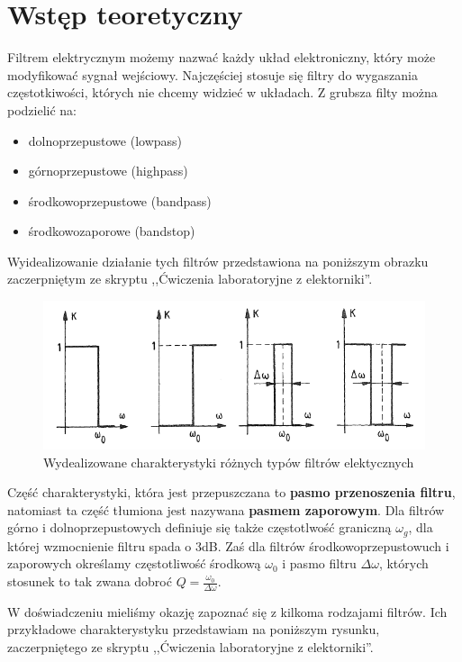\documentclass[a4paper,11pt]{article}
\begin{document}
\section{Wstęp teoretyczny}

Filtrem elektrycznym możemy nazwać każdy układ elektroniczny, który może modyfikować sygnał wejściowy. Najczęściej stosuje się filtry do wygaszania częstotkiwości, których nie chcemy widzieć w układach. Z grubsza filty można podzielić na: 
\begin{itemize}
  \item dolnoprzepustowe (lowpass) 
  \item górnoprzepustowe (highpass)
  \item środkowoprzepustowe (bandpass)
  \item środkowozaporowe (bandstop)
\end{itemize}
Wyidealizowanie działanie tych filtrów przedstawiona na poniższym obrazku zaczerpniętym ze skryptu ,,Ćwiczenia laboratoryjne z elektorniki''.  


\begin{figure} [H]
  \begin{center}
    \includegraphics[width=14cm]{filtry.png}

    \caption{ Wydealizowane charakterystyki różnych typów filtrów elektycznych}
  \end{center}
\end{figure}

Część charakterystyki, która jest przepuszczana to \textbf{pasmo przenoszenia filtru}, natomiast ta część tłumiona jest nazywana \textbf{pasmem zaporowym}. Dla filtrów górno i dolnoprzepustowych definiuje się także częstotlwość graniczną $ \omega_g$, dla której wzmocnienie filtru spada o 3dB. Zaś dla filtrów środkowoprzepustowuch i zaporowych określamy częstotliwość środkową $ \omega_0$ i pasmo filtru $\Delta \omega$, których stosunek to tak zwana dobroć $ Q=\frac {\omega_0}{\Delta \omega}$. 

W doświadczeniu mieliśmy okazję zapoznać się z kilkoma rodzajami filtrów. Ich przykładowe charakterystyku przedstawiam na poniższym rysunku, zaczerpniętego ze skryptu ,,Ćwiczenia laboratoryjne z elektorniki''. 
\end{document}
